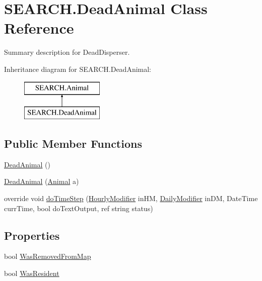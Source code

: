 \hypertarget{class_s_e_a_r_c_h_1_1_dead_animal}{\section{S\-E\-A\-R\-C\-H.\-Dead\-Animal Class Reference}
\label{class_s_e_a_r_c_h_1_1_dead_animal}
}


Summary description for Dead\-Disperser.  


Inheritance diagram for S\-E\-A\-R\-C\-H.\-Dead\-Animal\-:\begin{figure}[H]
\begin{center}
\leavevmode
\includegraphics[height=2.000000cm]{class_s_e_a_r_c_h_1_1_dead_animal}
\end{center}
\end{figure}
\subsection*{Public Member Functions}
\begin{DoxyCompactItemize}
\item 
\hyperlink{class_s_e_a_r_c_h_1_1_dead_animal_a628e113b6148236806c8c26d15a3bf0a}{Dead\-Animal} ()
\item 
\hyperlink{class_s_e_a_r_c_h_1_1_dead_animal_a1dd08661985b38a5e453650a634ca1f8}{Dead\-Animal} (\hyperlink{class_s_e_a_r_c_h_1_1_animal}{Animal} a)
\item 
override void \hyperlink{class_s_e_a_r_c_h_1_1_dead_animal_a5a17ff4e63a89738621522de0658ae7b}{do\-Time\-Step} (\hyperlink{class_s_e_a_r_c_h_1_1_hourly_modifier}{Hourly\-Modifier} in\-H\-M, \hyperlink{class_s_e_a_r_c_h_1_1_daily_modifier}{Daily\-Modifier} in\-D\-M, Date\-Time curr\-Time, bool do\-Text\-Output, ref string status)
\end{DoxyCompactItemize}
\subsection*{Properties}
\begin{DoxyCompactItemize}
\item 
bool \hyperlink{class_s_e_a_r_c_h_1_1_dead_animal_a2f76897f9f6724ef178f20e5fae18fab}{Was\-Removed\-From\-Map}
\item 
bool \hyperlink{class_s_e_a_r_c_h_1_1_dead_animal_a1bfa253d1b2f728f4b4682d0dbd0cc71}{Was\-Resident}
\end{DoxyCompactItemize}
